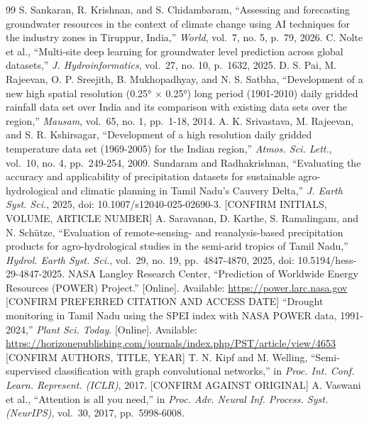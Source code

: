 \documentclass[conference]{IEEEtran}
\begin{document}
\begin{thebibliography}{99}
 S. Sankaran, R. Krishnan, and S. Chidambaram, ``Assessing and forecasting groundwater resources in the context of climate change using AI techniques for the industry zones in Tiruppur, India,'' \emph{World}, vol.~7, no. 5, p.~79, 2026.
 C. Nolte et al., ``Multi-site deep learning for groundwater level prediction across global datasets,'' \emph{J. Hydroinformatics}, vol.~27, no. 10, p.~1632, 2025.
 D. S. Pai, M. Rajeevan, O. P. Sreejith, B. Mukhopadhyay, and N. S. Satbha, ``Development of a new high spatial resolution (0.25° × 0.25°) long period (1901-2010) daily gridded rainfall data set over India and its comparison with existing data sets over the region,'' \emph{Mausam}, vol.~65, no. 1, pp.~1-18, 2014.
 A. K. Srivastava, M. Rajeevan, and S. R. Kshirsagar, ``Development of a high resolution daily gridded temperature data set (1969-2005) for the Indian region,'' \emph{Atmos. Sci. Lett.}, vol.~10, no. 4, pp.~249-254, 2009.
 Sundaram and Radhakrishnan, ``Evaluating the accuracy and applicability of precipitation datasets for sustainable agro-hydrological and climatic planning in Tamil Nadu's Cauvery Delta,'' \emph{J. Earth Syst. Sci.}, 2025, doi: 10.1007/s12040-025-02690-3. {[}CONFIRM INITIALS, VOLUME, ARTICLE NUMBER{]}
 A. Saravanan, D. Karthe, S. Ramalingam, and N. Schütze, ``Evaluation of remote-sensing- and reanalysis-based precipitation products for agro-hydrological studies in the semi-arid tropics of Tamil Nadu,'' \emph{Hydrol. Earth Syst. Sci.}, vol.~29, no. 19, pp.~4847-4870, 2025, doi: 10.5194/hess-29-4847-2025.
 NASA Langley Research Center, ``Prediction of Worldwide Energy Resources (POWER) Project.'' {[}Online{]}. Available: \url{https://power.larc.nasa.gov} {[}CONFIRM PREFERRED CITATION AND ACCESS DATE{]}
 ``Drought monitoring in Tamil Nadu using the SPEI index with NASA POWER data, 1991-2024,'' \emph{Plant Sci. Today}. {[}Online{]}. Available: \url{https://horizonepublishing.com/journals/index.php/PST/article/view/4653} {[}CONFIRM AUTHORS, TITLE, YEAR{]}
 T. N. Kipf and M. Welling, ``Semi-supervised classification with graph convolutional networks,'' in \emph{Proc. Int. Conf. Learn. Represent. (ICLR)}, 2017. {[}CONFIRM AGAINST ORIGINAL{]}
 A. Vaswani et al., ``Attention is all you need,'' in \emph{Proc. Adv. Neural Inf. Process. Syst. (NeurIPS)}, vol.~30, 2017, pp.~5998-6008.
\end{thebibliography}
\end{document}
